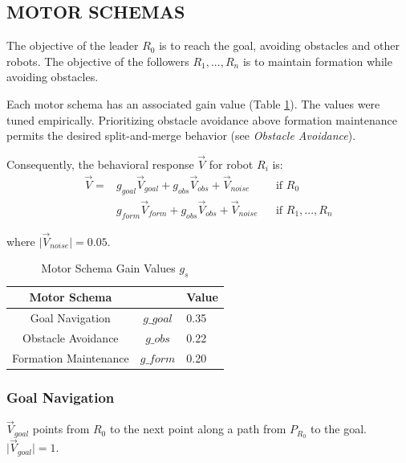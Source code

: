 \documentclass[letterpaper, 10 pt, conference]{ieeeconf}  %
\begin{document}
\subsection{MOTOR SCHEMAS}

The objective of the leader $R_0$ is to reach the goal, avoiding obstacles and other robots. The objective of the followers $R_1,...,R_n$ is to maintain formation while avoiding obstacles.

Each motor schema has an associated gain value (Table \ref{motor_schema_gs}). The values were tuned empirically. Prioritizing obstacle avoidance above formation maintenance permits the desired split-and-merge behavior (see \textit{Obstacle Avoidance}).

Consequently, the behavioral response $\vec{V}$ for robot $R_i$ is:
\begin{equation*}
\begin{aligned}
\vec{V} = & g_{goal} \vec{V}_{goal} + g_{obs} \vec{V}_{obs} + \vec{V}_{noise}    && \text{if $R_0$} \\
              & g_{form} \vec{V}_{form} + g_{obs} \vec{V}_{obs} + \vec{V}_{noise}   && \text{if $R_1,...,R_n$}
\end{aligned}
\end{equation*}

where $\lvert\vec{V}_{noise}\rvert = 0.05$.

\begin{table}[h]
\begin{center}
\begin{tabular}{|c|cl|}
\hline
Motor Schema &  & Value \\
\hline
Goal Navigation & $g\_goal$                  & 0.35 \\
Obstacle Avoidance & $g\_obs$     & 0.22 \\
Formation Maintenance & $g\_form$       & 0.20 \\
\hline
\end{tabular}
\end{center}
\caption{Motor Schema Gain Values $g_s$}
\label{motor_schema_gs}
\end{table}

\subsubsection*{Goal Navigation}

$\vec{V}_{goal}$ points from $R_0$ to the next point along a path from $P_{R_0}$ to the goal. $\vert \vec{V}_{goal} \rvert = 1$.
\end{document}
